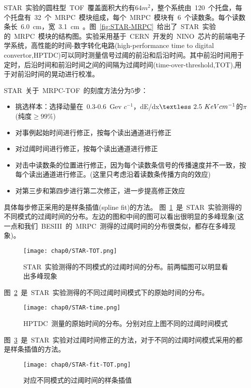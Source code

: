 STAR~实验的圆柱型~TOF~覆盖面积大约有64$m^{2}$，整个系统由~120~个托盘，每个托盘有~32~个~MRPC~模块组成，每个~MRPC~模块有~6~个读数条。每个读数条长~6.0~cm，宽~3.1~cm~\cite{wangy:2010}。图~\ref{fig:STAR-MRPC}~给出了~STAR~实验的~MRPC~模块的结构图。实验采用基于~CERN~开发的~NINO~芯片的前端电子学系统，高性能的时间-数字转化电路(high-performance time to digital convertor,HPTDC)可以同时测量信号过阈的前沿和后沿时间。其中前沿时间用于定时，后沿时间和前沿时间之间的间隔为过阈时间(time-over-threshold,TOT),用于对前沿时间的晃动进行校准。

STAR~关于~MRPC-TOF~的刻度方法分为5步：
\begin{itemize}
\item{挑选样本：选择动量在~0.3-0.6~Gev $c^{-1}$，dE/dx$\textless~2.5~KeV cm^{-1}$的$\pi$(纯度$\geq99$$\%$)}
\item{对事例起始时间进行修正，按每个读出通道进行修正}
\item{对过阈时间进行修正，按每个读出通道进行修正}
\item{对击中读数条的位置进行修正，因为每个读数条信号的传播速度并不一致，按每个读出通道进行修正。(这里只考虑沿着读数条传播方向的效应)}
\item{对第三步和第四步进行第二次修正，进一步提高修正效应}
\end{itemize}

具体每步修正采用的是样条插值(spline fit)的方法。
图~\ref{fig:STAR-TOT}~是~STAR~实验测得的不同模式的过阈时间的分布。左边的图和中间的图可以看出很明显的多峰现象(这一点和我们~BESIII~的~MRPC~测得的过阈时间的分布很类似，都存在多峰现象)。
\begin{figure}[!h]
  \centering
  \texttt{[image: chap0/STAR-TOT.png]}
  \caption{STAR~实验测得的不同模式的过阈时间的分布。前两幅图可以明显看出多峰现象}
  \label{fig:STAR-TOT}
\end{figure}

图~\ref{fig:STAR-time}~是~STAR~实验测得的不同过阈时间模式下的原始时间的分布。
\begin{figure}[!h]
  \centering
  \texttt{[image: chap0/STAR-time.png]}
  \caption{HPTDC~测量的原始时间的分布。分别对应上图不同的过阈时间模式}
  \label{fig:STAR-time}
\end{figure}

图~\ref{fig:STAR-fit-TOT}~是~STAR~实验对过阈时间修正的方法，对于不同的过阈时间模式采用的都是样条插值的方法。
\begin{figure}[!h]
  \centering
  \texttt{[image: chap0/STAR-fit-TOT.png]}
  \caption{对应不同模式的过阈时间的样条插值}
  \label{fig:STAR-fit-TOT}
\end{figure}

